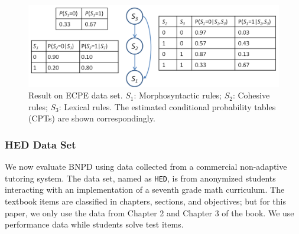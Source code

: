\documentclass{edm_template}
\begin{document}
{			\begin{figure}[!th]
				\begin{center}
					\centering
					\includegraphics[width=1.0\linewidth]{figures/ecpe_results.png}
				\end{center}
				\caption{Result on ECPE data set. $S_1$: Morphosyntactic rules; $S_2$: Cohesive rules; $S_3$: Lexical rules. 
					The estimated conditional probability tables (CPTs) are shown correspondingly.}
				\label{fig:ecpe-result} 
			\end{figure}
	
	\subsubsection{HED Data Set}
	We now evaluate BNPD using data collected from a commercial non-adaptive tutoring system.
	The data set, named as \texttt{HED}, is from anonymized students interacting with an implementation of a seventh grade math curriculum.
	The textbook items are classified in chapters, sections, and objectives; but for this paper, we only use the data from Chapter 2 and Chapter 3 of the book.
	We use performance data while students solve test items.
	
	
}
\end{document}
